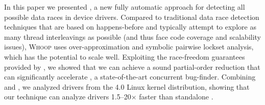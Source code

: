 In this paper we presented \whoop, a new fully automatic approach for detecting all possible data races in device drivers. Compared to traditional data race detection techniques that are based on happens-before and typically attempt to explore as many thread interleavings as possible (and thus face code coverage and scalability issues), \textsc{Whoop} uses over-approximation and symbolic pairwise lockset analysis, which has the potential to scale well. Exploiting the race-freedom guarantees provided by \whoop, we showed that we can achieve a sound partial-order reduction that can significantly accelerate \corral, a state-of-the-art concurrent bug-finder. Combining \whoop and \corral, we analyzed \sizeOfBenchmarks drivers from the 4.0 Linux kernel distribution, showing that our technique can analyze drivers 1.5--20$\times$ faster than standalone \corral.